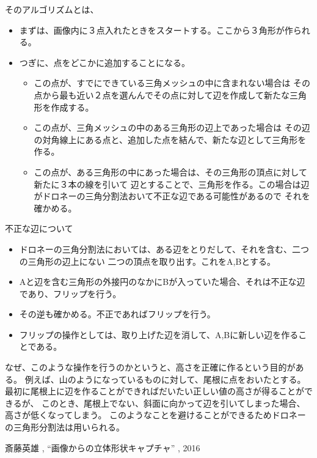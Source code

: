 \documentclass[11pt,a4j]{jsarticle}
\begin{document}
そのアルゴリズムとは、
\begin{itemize}
  \item まずは、画像内に３点入れたときをスタートする。ここから３角形が作られる。
  \item つぎに、点をどこかに追加することになる。
  \begin{itemize}
    \item この点が、すでにできている三角メッシュの中に含まれない場合は
    その点から最も近い２点を選んんでその点に対して辺を作成して新たな三角形を作成する。
    \item この点が、三角メッシュの中のある三角形の辺上であった場合は
    その辺の対角線上にある点と、追加した点を結んで、新たな辺として三角形を作る。
    \item この点が、ある三角形の中にあった場合は、その三角形の頂点に対して新たに３本の線を引いて
    辺とすることで、三角形を作る。この場合は辺がドロネーの三角分割法おいて不正な辺である可能性があるので
    それを確かめる。
  \end{itemize}
\end{itemize}

不正な辺について
\begin{itemize}
  \item ドロネーの三角分割法においては、ある辺をとりだして、それを含む、二つの三角形の辺上にない
  二つの頂点を取り出す。これをA,Bとする。
  \item Aと辺を含む三角形の外接円のなかにBが入っていた場合、それは不正な辺であり、フリップを行う。
  \item その逆も確かめる。不正であればフリップを行う。
  \item フリップの操作としては、取り上げた辺を消して、A,Bに新しい辺を作ることである。
\end{itemize}

なぜ、このような操作を行うのかというと、高さを正確に作るという目的がある。
例えば、山のようになっているものに対して、尾根に点をおいたとする。
最初に尾根上に辺を作ることができればだいたい正しい値の高さが得ることができるが、
このとき、尾根上でない、斜面に向かって辺を引いてしまった場合、高さが低くなってしまう。
このようなことを避けることができるためドロネーの三角形分割法は用いられる。






\begin{thebibliography}{9} %
 斎藤英雄 , ``画像からの立体形状キャプチャ'' , 2016
\end{thebibliography}
\end{document}
